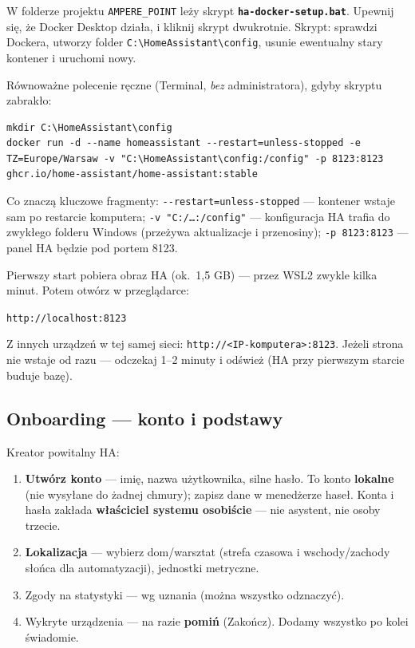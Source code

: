 \documentclass[11pt,a4paper]{article}
\begin{document}
W folderze projektu \texttt{AMPERE\_POINT} leży skrypt \textbf{\texttt{ha-docker-setup.bat}}. Upewnij się, że Docker Desktop działa, i kliknij skrypt dwukrotnie. Skrypt: sprawdzi Dockera, utworzy folder \texttt{C:\textbackslash HomeAssistant\textbackslash config}, usunie ewentualny stary kontener i uruchomi nowy.

Równoważne polecenie ręczne (Terminal, \emph{bez} administratora), gdyby skryptu zabrakło:

\begin{lstlisting}
mkdir C:\HomeAssistant\config
docker run -d --name homeassistant --restart=unless-stopped -e TZ=Europe/Warsaw -v "C:\HomeAssistant\config:/config" -p 8123:8123 ghcr.io/home-assistant/home-assistant:stable
\end{lstlisting}

Co znaczą kluczowe fragmenty: \texttt{-{}-restart=unless-stopped} --- kontener wstaje sam po restarcie komputera; \texttt{-v "C:/\ldots:/config"} --- konfiguracja HA trafia do zwykłego folderu Windows (przeżywa aktualizacje i przenosiny); \texttt{-p 8123:8123} --- panel HA będzie pod portem 8123.

Pierwszy start pobiera obraz HA (ok.~1,5 GB) --- przez WSL2 zwykle kilka minut. Potem otwórz w przeglądarce:

\begin{center}\Large\texttt{http://localhost:8123}\end{center}

Z innych urządzeń w tej samej sieci: \texttt{http://<IP-komputera>:8123}. Jeżeli strona nie wstaje od razu --- odczekaj 1--2 minuty i odśwież (HA przy pierwszym starcie buduje bazę).

\subsection{Onboarding --- konto i podstawy}

Kreator powitalny HA:
\begin{enumerate}
\item \textbf{Utwórz konto} --- imię, nazwa użytkownika, silne hasło. To konto \textbf{lokalne} (nie wysyłane do żadnej chmury); zapisz dane w menedżerze haseł. Konta i hasła zakłada \textbf{właściciel systemu osobiście} --- nie asystent, nie osoby trzecie.
\item \textbf{Lokalizacja} --- wybierz dom/warsztat (strefa czasowa i wschody/zachody słońca dla automatyzacji), jednostki metryczne.
\item Zgody na statystyki --- wg uznania (można wszystko odznaczyć).
\item Wykryte urządzenia --- na razie \textbf{pomiń} (Zakończ). Dodamy wszystko po kolei świadomie.
\end{enumerate}
\end{document}
